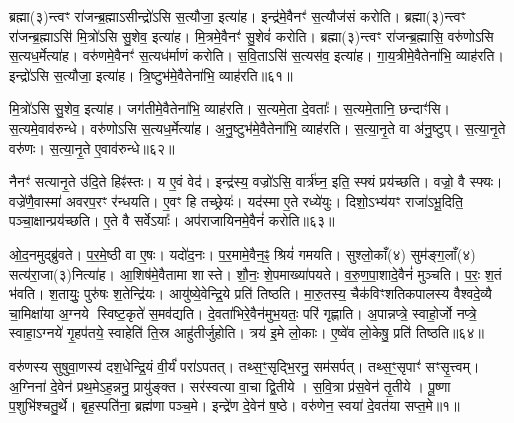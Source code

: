 ब्रह्मा(३)न्त्वꣳ रा॑जन्ब्र॒ह्मा\-ऽसीन्द्रो॑ऽसि स॒त्यौजा॒ इत्या॑ह।
इन्द्र॑मे॒वैनꣳ॑ स॒त्यौज॑सं करोति।
ब्रह्मा(३)न्त्वꣳ रा॑जन्ब्र॒ह्माऽसि॑ मि॒त्रो॑ऽसि सु॒शेव॒ इत्या॑ह।
मि॒त्रमे॒वैनꣳ॑ सु॒शेवं॑ करोति।
ब्रह्मा(३)न्त्वꣳ रा॑जन्ब्र॒ह्मासि॒ वरु॑णोऽसि स॒त्यध॒र्मेत्या॑ह।
वरु॑णमे॒वैनꣳ॑ स॒त्यध॑र्माणं करोति।
स॒वि॒ताऽसि॑ स॒त्यस॑व॒ इत्या॑ह।
गा॒य॒त्रीमे॒वैतेना॑भि॒ व्याह॑रति।
इन्द्रो॑ऽसि स॒त्यौजा॒ इत्या॑ह।
त्रि॒ष्टुभ॑मे॒वैतेना॑भि॒ व्याह॑रति॥६१॥

मि॒त्रो॑ऽसि सु॒शेव॒ इत्या॑ह।
जग॑तीमे॒वैतेना॑भि॒ व्याह॑रति।
स॒त्यमे॒ता दे॒वताः᳚।
स॒त्यमे॒तानि॒ छन्दाꣳ॑सि।
स॒त्यमे॒वाव॑\-रुन्धे।
वरु॑णोऽसि स॒त्यध॒र्मेत्या॑ह।
अ॒नु॒ष्टुभ॑मे॒वैतेना॑भि॒ व्याह॑रति।
स॒त्या॒नृ॒ते वा अ॑नु॒ष्टुप्।
स॒त्या॒नृ॒ते वरु॑णः।
स॒त्या॒नृ॒ते ए॒वाव॑रुन्धे॥६२॥

नैनꣳ॑ सत्यानृ॒ते उ॑दि॒ते हिꣴ॑स्तः।
य ए॒वं वेद॑।
इन्द्र॑स्य॒ वज्रो॑ऽसि॒ वार्त्र॑घ्न॒ इति॒ स्फ्यं प्रय॑च्छति।
वज्रो॒ वै स्फ्यः।
वज्रे॑णै॒वास्मा॑ अवरप॒रꣳ र॑न्धयति।
ए॒वꣳ हि तच्छ्रेयः॑।
यद॑स्मा ए॒ते रध्ये॑युः।
दिशो॒\-ऽभ्य॑यꣳ राजा॑\-ऽभू॒दिति॒ पञ्चा॒क्षान्प्रय॑च्छति।
ए॒ते वै सर्वे\-ऽयाः᳚।
अप॑राजायिनमे॒वैनं॑ करोति॥६३॥

ओ॒द॒नमुद्ब्रु॑वते।
प॒र॒मे॒ष्ठी वा ए॒षः।
यदो॑द॒नः।
प॒र॒मामे॒वैन॒ꣴ॒ श्रियं॑ गमयति।
सुश्लो॒काँ(४) सुम॑ङ्ग॒लाँ(४) सत्य॑रा॒जा(३)\-नित्या॑ह।
आ॒शिष॑मे॒वैतामा शास्ते।
शौ॒नः॒ शे॒पमाख्या॑पयते।
व॒रु॒ण॒पा॒शादे॒वैनं॑ मुञ्चति।
प॒रः॒ श॒तं भ॑वति।
श॒तायुः॒ पुरु॑षः श॒तेन्द्रि॑यः।
आयु॑ष्ये॒वेन्द्रि॒ये प्रति॑ तिष्ठति।
मा॒रु॒तस्य॒ चैक॑विꣳशतिकपालस्य वैश्वदे॒व्यै चा॒मिक्षा॑या अ॒ग्नये स्विष्ट॒कृते॑ स॒मव॑द्यति।
दे॒वता॑भिरे॒वैन॑मुभ॒यतः॒ परि॑ गृह्णाति।
अ॒पान्नप्त्रे॒ स्वाहो॒र्जो नप्त्रे॒ स्वाहा॒\-ऽग्नये॑ गृ॒हप॑तये॒ स्वाहेति॑ ति॒स्र आहु॑तीर्जुहोति।
त्रय॑ इ॒मे लो॒काः।
ए॒ष्वे॑व लो॒केषु॒ प्रति॑ तिष्ठति॥६४॥\anuvakamend[दे॒वैरित्या॑ह स॒त्यस॑वं करोति त्रि॒ष्टुभ॑मे॒वैतेना॑भि॒ व्याह॑रति सत्यानृ॒ते ए॒वाव॑रुन्धे करोति श॒तेन्द्रि॑यः॒ षट् च॑]




\clearpage
{}
\setcounter{anuvakam}{0}

वरु॑णस्य सुषुवा॒णस्य॑ दश॒धेन्द्रि॒यं वी॒र्यं॑ परा॑\-ऽपतत्।
तथ्स॒ꣳ॒सृद्भि॒रनु॒ सम॑सर्पत्।
तथ्स॒ꣳ॒सृपाꣳ॑ सꣳसृ॒त्त्वम्।
अ॒ग्निना॑ दे॒वेन॑ प्रथ॒मे\-ऽह॒न्ननु॒ प्रायु॑ङ्क्त।
सर॑स्वत्या वा॒चा द्वि॒तीये।
स॒वि॒त्रा प्र॑स॒वेन॑ तृ॒तीये।
पू॒ष्णा प॒शुभि॑श्चतु॒र्थे।
बृह॒स्पति॑ना॒ ब्रह्म॑णा पञ्च॒मे।
इन्द्रे॑ण दे॒वेन॑ ष॒ष्ठे।
वरु॑णेन॒ स्वया॑ दे॒वत॑या सप्त॒मे॥१॥

